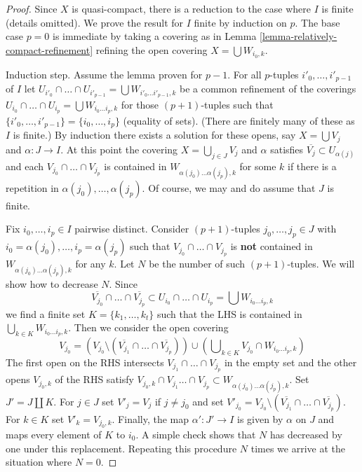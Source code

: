 \begin{proof}
Since $X$ is quasi-compact, there is a reduction to the
case where $I$ is finite (details omitted).
We prove the result for $I$ finite by induction on $p$.
The base case $p = 0$ is immediate by taking a covering as in
Lemma \ref{lemma-relatively-compact-refinement}
refining the open covering $X = \bigcup W_{i_0, k}$.

\medskip\noindent
Induction step. Assume the lemma proven for $p - 1$.
For all $p$-tuples $i'_0, \ldots, i'_{p - 1}$ of $I$ let
$U_{i'_0} \cap \ldots \cap U_{i'_{p - 1}} =
\bigcup W_{i'_0 \ldots i'_{p - 1}, k}$
be a common refinement of the coverings
$U_{i_0} \cap \ldots \cap U_{i_p} = \bigcup W_{i_0 \ldots i_p, k}$
for those $(p + 1)$-tuples such that
$\{i'_0, \ldots, i'_{p - 1}\} = \{i_0, \ldots, i_p\}$ (equality of sets).
(There are finitely many of these as $I$ is finite.)
By induction there exists a solution for these opens, say
$X = \bigcup V_j$ and $\alpha : J \to I$.
At this point the covering $X = \bigcup_{j \in J} V_j$
and $\alpha$ satisfies $\overline{V_j} \subset U_{\alpha(j)}$
and each $V_{j_0} \cap \ldots \cap V_{j_p}$
is contained in $W_{\alpha(j_0) \ldots \alpha(j_p), k}$
for some $k$ if there is a repetition in $\alpha(j_0), \ldots, \alpha(j_p)$.
Of course, we may and do assume that $J$ is finite.

\medskip\noindent
Fix $i_0, \ldots, i_p \in I$ pairwise distinct. Consider $(p + 1)$-tuples
$j_0, \ldots, j_p \in J$ with $i_0 = \alpha(j_0), \ldots, i_p = \alpha(j_p)$
such that $V_{j_0} \cap \ldots \cap V_{j_p}$
is {\bf not} contained in $W_{\alpha(j_0) \ldots \alpha(j_p), k}$ for any $k$.
Let $N$ be the number of such $(p + 1)$-tuples. We will show how to decrease
$N$. Since
$$
\overline{V_{j_0}} \cap \ldots \cap \overline{V_{j_p}} \subset
U_{i_0} \cap \ldots \cap U_{i_p} = \bigcup W_{i_0 \ldots i_p, k}
$$
we find a finite set $K = \{k_1, \ldots, k_t\}$ such that the LHS
is contained in $\bigcup_{k \in K} W_{i_0 \ldots i_p, k}$.
Then we consider the open covering
$$
V_{j_0} =
(V_{j_0} \setminus (\overline{V_{j_1}} \cap \ldots \cap \overline{V_{j_p}}))
\cup (\bigcup\nolimits_{k \in K} V_{j_0} \cap W_{i_0 \ldots i_p, k})
$$
The first open on the RHS intersects $V_{j_1} \cap \ldots \cap V_{j_p}$
in the empty set and the other opens $V_{j_0, k}$ of the RHS
satisfy $V_{j_0, k} \cap V_{j_1} \ldots \cap V_{j_p} \subset
W_{\alpha(j_0) \ldots \alpha(j_p), k}$.
Set $J' = J \amalg K$. For $j \in J$ set $V'_j = V_j$ if $j \not = j_0$
and set $V'_{j_0} =
V_{j_0} \setminus (\overline{V_{j_1}} \cap \ldots \cap \overline{V_{j_p}})$.
For $k \in K$ set $V'_k = V_{j_0, k}$. Finally, the map $\alpha' : J' \to I$
is given by $\alpha$ on $J$ and maps every element of $K$ to $i_0$.
A simple check shows that $N$ has decreased by one under this replacement.
Repeating this procedure $N$ times we arrive at the situation where
$N = 0$.


\end{proof}
